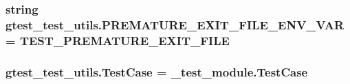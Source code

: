 \subsubsection[{P\+R\+E\+M\+A\+T\+U\+R\+E\+\_\+\+E\+X\+I\+T\+\_\+\+F\+I\+L\+E\+\_\+\+E\+N\+V\+\_\+\+V\+A\+R}]{\setlength{\rightskip}{0pt plus 5cm}string gtest\+\_\+test\+\_\+utils.\+P\+R\+E\+M\+A\+T\+U\+R\+E\+\_\+\+E\+X\+I\+T\+\_\+\+F\+I\+L\+E\+\_\+\+E\+N\+V\+\_\+\+V\+A\+R = \textquotesingle{}T\+E\+S\+T\+\_\+\+P\+R\+E\+M\+A\+T\+U\+R\+E\+\_\+\+E\+X\+I\+T\+\_\+\+F\+I\+L\+E\textquotesingle{}}\label{namespacegtest__test__utils_aa961c38a16224b2e7fd8c93fc1d2a90f}
\hypertarget{namespacegtest__test__utils_acb97a85206c09d233db6c7f2362e5428}{}
\subsubsection[{Test\+Case}]{\setlength{\rightskip}{0pt plus 5cm}gtest\+\_\+test\+\_\+utils.\+Test\+Case = \+\_\+test\+\_\+module.\+Test\+Case}\label{namespacegtest__test__utils_acb97a85206c09d233db6c7f2362e5428}
